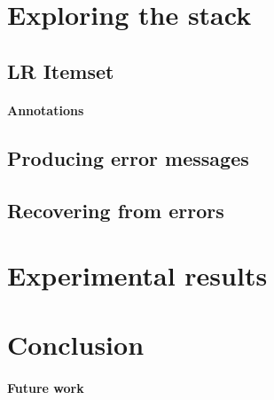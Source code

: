 \documentclass[twoside,a4paper]{article}
\begin{document}
\section{Exploring the stack}

\subsection{LR Itemset}

\paragraph{Annotations}

\subsection{Producing error messages}

\subsection{Recovering from errors}

\section{Experimental results}

\section{Conclusion}


\paragraph{Future work}






\end{document}

